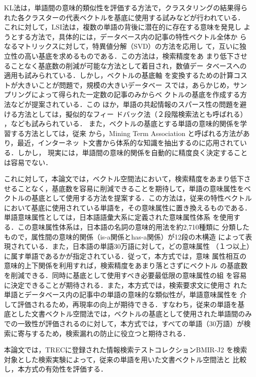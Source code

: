 KL法は，単語間の意味的類似性を評価する方法で，クラスタリングの結果得ら
れた各クラスターの代表ベクトルを基底に使用する試みなどが行われている．
これに対して，LSI法は，複数の単語の背後に潜在的に存在する意味を発見し
ようとする方法で，具体的には，データベース内の記事の特性ベクトル全体か
らなるマトリックスに対して，特異値分解（SVD）の方法\cite{Golub}を応用し
て，互いに独立性の高い基底を求めるものである．この方法は，検索精度をあ
まり低下させることなく基底数の削減が可能な方法として着目され，数値デー
タベースへの適用\cite{Jiang}も試みられている．しかし，ベクトルの基底軸
を変換するための計算コストが大きいことが問題で，規模の大きいデータベー
スでは，あらかじめ，サンプリングによって得られた一定数の記事のみからベ
クトルの基底を作成する方法\cite{Deerwester}などが提案されている．この
ほか，単語の共起情報のスパース性の問題を避ける方法としては，擬似的なフィー
ドバック法（２段階検索法とも呼ばれる）
\cite{Burkley}，\cite{Kwok}なども試みられている．
また，ベクトルの基底とする単語の意味的関係を学習する方法としては，従来
から，Mining Term Association と呼ばれる方法があり，最近，インターネッ
ト文書から体系的な知識を抽出するのに応用されている\cite{Lin}．しかし，
現実には，単語間の意味的関係を自動的に精度良く決定することは容易でない．

これに対して，本論文では，ベクトル空間法において，検索精度をあまり低下さ
せることなく，基底数を容易に削減できることを期待して，単語の意味属性をベ
クトルの基底として使用する方法を提案する．この方法は，従来の特性ベクトル
において基底に使用されている単語を，その意味属性に置き換えるものである．
単語意味属性としては，日本語語彙大系\cite{池原}に定義された意味属性体系
を使用する．この意味属性体系は，日本語の名詞の意味的用法を約2,710種類に
分類したもので，属性間の意味的関係（is-a関係とhas-a関係）が12段の木構造
によって表現されている．また，日本語の単語30万語に対して，どの意味属性
（１つ以上）に属す単語であるかが指定されている．従って，本方式では，意味
属性相互の意味的上下関係を利用すれば，検索精度をあまり落とさずにベクトル
の基底数を削減できる．同時に基底として使用すべき必要最低限の意味属性の組
を容易に決定できることが期待される．また，本方式では，検索要求文に使用さ
れた単語とデータベース内の記事中の単語の意味的な類似性が，単語意味属性を
介して評価されるため，再現率の向上が期待できる．すなわち，従来の単語を基
底とした文書ベクトル空間法では，ベクトルの基底として使用された単語間のみ
での一致性が評価されるのに対して，本方式では，すべての単語（30万語）が検
索に寄与するため，検索漏れの防止に役立つと期待される．

本論文では，TRECに登録された情報検索テストコレクションBMIR-J2\cite{木谷}
を検索対象とした検索実験によって，従来の単語を用いた文書ベクトル空間法と
比較し，本方式の有効性を評価する．


